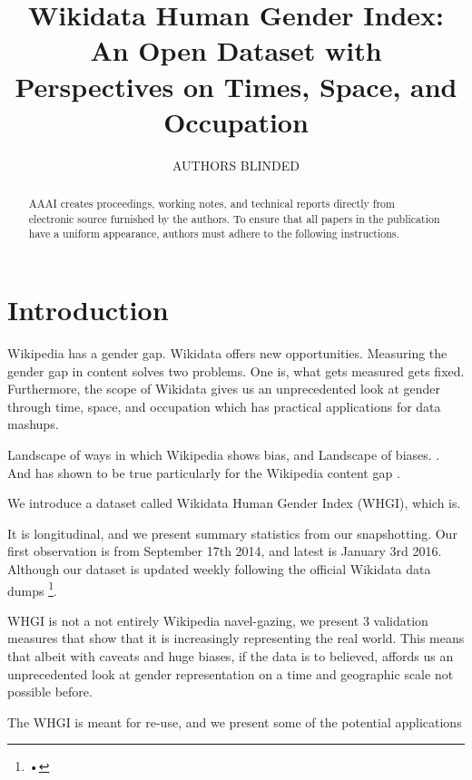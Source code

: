 \documentclass[letterpaper]{article}
\begin{document}
%
\title{Wikidata Human Gender Index: An Open Dataset with Perspectives on Times, Space, and Occupation}

\author{AUTHORS BLINDED}
    
\maketitle
\begin{abstract}
AAAI creates proceedings, working notes, and technical reports directly from electronic source furnished by the authors. To ensure that all papers in the publication have a uniform appearance, authors must adhere to the following instructions. 
\end{abstract}


\section{Introduction}
Wikipedia has a gender gap. Wikidata offers new opportunities. \cite{wikidata-release}
Measuring the gender gap in content solves two problems. One is, what gets measured gets fixed. Furthermore, the scope of Wikidata gives us an unprecedented look at gender through time, space, and occupation which has practical applications for data mashups. 

Landscape of ways in which Wikipedia shows bias, and Landscape of biases. \cite{Wagner}. And has shown to be true particularly for the Wikipedia content gap \cite{carlosnotebook}.

We introduce a dataset called Wikidata Human Gender Index (WHGI), which is.

It is longitudinal, and we present summary statistics from our snapshotting. Our first observation is from September 17th 2014, and latest is January 3rd 2016. Although our dataset is updated weekly following the official Wikidata data dumps \footnote{•}.

WHGI is not a not entirely Wikipedia navel-gazing, we present 3 validation measures that show that it is increasingly representing the real world. This means that albeit with caveats and huge biases, if the data is to believed, affords us an unprecedented look at gender representation on a time and geographic scale not possible before.

The WHGI is meant for re-use, and we present some of the potential applications 
\end{document}

